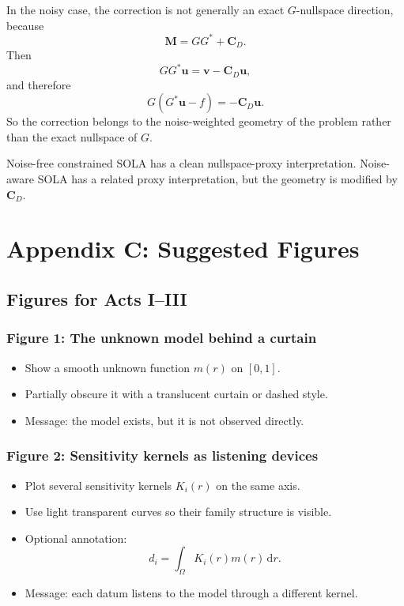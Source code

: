 \documentclass[11pt,openany]{book}
\theoremstyle{definition}
\theoremstyle{remark}
\newcommand{\dd}{\,\mathrm d}
\begin{document}
In the noisy case, the correction is not generally an exact \(G\)-nullspace direction, because
\[
  \mathbf M=GG^*+\mathbf C_D.
\]
Then
\[
  GG^*\mathbf u
  =
  \mathbf v-\mathbf C_D\mathbf u,
\]
and therefore
\[
  G(G^*\mathbf u-f)
  =
  -\mathbf C_D\mathbf u.
\]
So the correction belongs to the noise-weighted geometry of the problem rather than the exact
nullspace of \(G\).

\begin{checkpointbox}
Noise-free constrained SOLA has a clean nullspace-proxy interpretation. Noise-aware SOLA has
a related proxy interpretation, but the geometry is modified by \(\mathbf C_D\).
\end{checkpointbox}


\chapter{Appendix C: Suggested Figures}

\section{Figures for Acts I--III}

\subsection*{Figure 1: The unknown model behind a curtain}

\begin{itemize}[leftmargin=*]
  \item Show a smooth unknown function \(m(r)\) on \([0,1]\).
  \item Partially obscure it with a translucent curtain or dashed style.
  \item Message: the model exists, but it is not observed directly.
\end{itemize}

\subsection*{Figure 2: Sensitivity kernels as listening devices}

\begin{itemize}[leftmargin=*]
  \item Plot several sensitivity kernels \(K_i(r)\) on the same axis.
  \item Use light transparent curves so their family structure is visible.
  \item Optional annotation:
  \[
    d_i=\int_\Omega K_i(r)m(r)\dd r.
  \]
  \item Message: each datum listens to the model through a different kernel.
\end{itemize}
\end{document}
